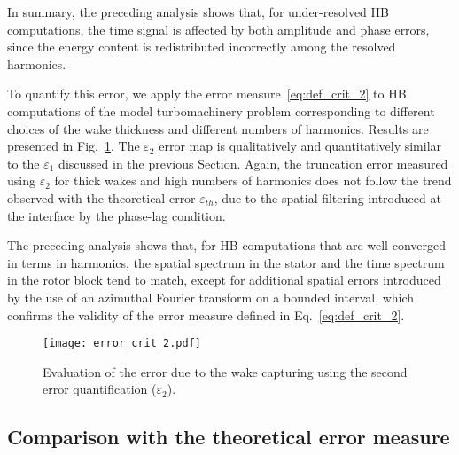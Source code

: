 In summary, the preceding analysis shows that, 
for under-resolved HB computations, the time 
signal is affected by both amplitude and phase errors, 
since the energy content is redistributed incorrectly 
among the resolved harmonics.

To quantify this error, we apply the error measure~\eqref{eq:def_crit_2}
to HB computations of the model turbomachinery 
problem corresponding to different choices 
of the wake thickness and different numbers of 
harmonics. Results are presented in Fig.~\ref{fig:crit_2_3d}.
The $\varepsilon_2$ error map is qualitatively 
and quantitatively similar to the $\varepsilon_1$ 
discussed in the previous Section. 
Again, the truncation error measured using $\varepsilon_2$ 
for thick wakes and high numbers of harmonics 
does not follow the trend observed with the 
theoretical error $\varepsilon_{th}$, 
due to the spatial filtering introduced at the 
interface by the phase-lag condition.

The preceding analysis shows that, for HB computations 
that are well converged in terms in harmonics, 
the spatial spectrum in the stator and the 
time spectrum in the rotor block tend to match, 
except for additional spatial errors introduced
by the use of an azimuthal Fourier transform on a 
bounded interval, which confirms the 
validity of the error measure defined in Eq.~\eqref{eq:def_crit_2}.
\begin{figure}[htp]
   \centering \texttt{[image: error\_crit\_2.pdf]}
  \caption{Evaluation of the error due to the wake 
  capturing using the second error quantification ($\varepsilon_2$).}
  \label{fig:crit_2_3d}
\end{figure}

\subsection{Comparison with the theoretical error measure}
\label{sub:comp_w_analytic}


